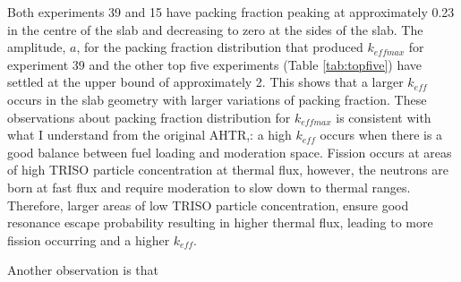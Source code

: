 Both experiments 39 and 15 have packing fraction peaking at approximately 
0.23 in the centre of the slab and decreasing to zero at the sides of the slab.  
The amplitude, $a$, for the packing fraction distribution that produced $k_{eff max}$ 
for experiment 39 and the other top five experiments (Table \ref{tab:topfive}) 
have settled at the upper bound of approximately 2. 
This shows that a larger $k_{eff}$ occurs in the slab geometry with larger 
variations of packing fraction. 
These observations about packing fraction distribution for $k_{eff max}$ is 
consistent with what I understand from the original \gls{AHTR},: a high $k_{eff}$ 
occurs when there is a good balance between fuel loading and moderation space. 
Fission occurs at areas of high \gls{TRISO} particle concentration at thermal flux, 
however, the neutrons are born at fast flux and require moderation to slow down 
to thermal ranges.
Therefore, larger areas of low TRISO particle concentration, ensure good 
resonance escape probability resulting in higher thermal flux, leading to more 
fission occurring and a higher $k_{eff}$. 

Another observation is that 